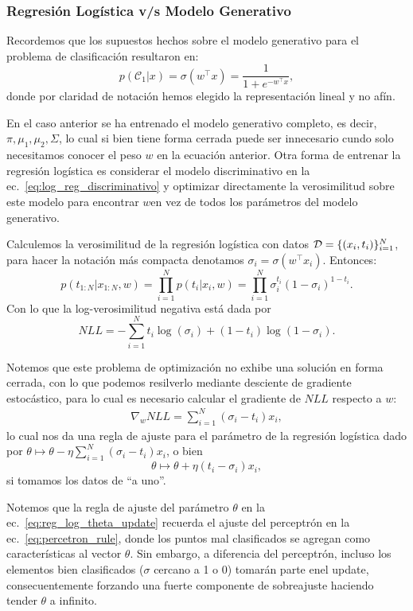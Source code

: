 \subsubsection{Regresión Logística v/s Modelo Generativo}

Recordemos que los supuestos hechos sobre el modelo generativo para el problema de clasificación resultaron en:
\begin{equation}
p(\mathcal{C}_1|x) = \sigma(w^\top x) = \frac{1}{1+e^{-w^\top x}} \label{eq:log_reg_discriminativo},
\end{equation}
donde por claridad de notación hemos elegido la representación lineal y no afín. 

En el caso anterior se ha entrenado el modelo generativo completo, es decir, $\pi, \mu_1,\mu_2, \Sigma$, lo cual si  bien tiene forma cerrada puede ser innecesario cundo solo necesitamos conocer el peso $w$ en la ecuación anterior. Otra forma de entrenar la  regresión logística es considerar el modelo discriminativo en la  ec.~\eqref{eq:log_reg_discriminativo} y optimizar  directamente la verosimilitud sobre  este modelo para encontrar $w$en vez de todos los parámetros  del modelo generativo.

Calculemos la verosimilitud de la regresión logística con datos ${\mathcal D}=\{(x_i,t_i)\}_{i=1}^N$, para hacer la notación más compacta denotamos $\sigma_i = \sigma(w^\top x_i)$. Entonces:
\begin{equation}
p(t_{1:N}|x_{1:N},w) = \prod_{i=1}^{N}p(t_i|x_i,w) =  \prod_{i=1}^{N}\sigma_i^{t_i}(1-\sigma_i)^{1-t_i}.
\end{equation}
Con lo que la log-verosimilitud negativa está dada por
\begin{equation}
	NLL = -\sum_{i=1}^N t_i\log(\sigma_i) + (1-t_i)\log(1-\sigma_i).
\end{equation}

Notemos que este  problema de optimización no exhibe una solución en forma cerrada, con lo que podemos resilverlo mediante desciente de gradiente estocástico, para lo cual es necesario calcular el gradiente de $NLL$ respecto a $w$:
\begin{align}
\nabla_w NLL = \sum_{i=1}^N (\sigma_i-t_i)x_i,
\end{align}
lo cual nos da una regla de  ajuste para el parámetro de la regresión logística dado por $\theta \mapsto \theta - \eta \sum_{i=1}^N (\sigma_i-t_i)x_i$, o bien 
\begin{equation}
	\theta \mapsto \theta + \eta(t_i-\sigma_i)x_i, \label{eq:reg_log_theta_update}
\end{equation}
si tomamos los  datos de ``a uno''.
\begin{remark}\label{rem:log_reg_shocks}
Notemos que la regla de ajuste del parámetro $\theta$ en la ec.~\eqref{eq:reg_log_theta_update} recuerda el ajuste del perceptrón en la ec.~\eqref{eq:percetron_rule}, donde los puntos mal clasificados se agregan como características al vector $\theta$. Sin  embargo, a diferencia del  perceptrón, incluso los elementos bien clasificados ($\sigma$  cercano a  1 o 0) tomarán parte enel update, consecuentemente forzando una  fuerte componente de sobreajuste  haciendo tender $\theta$ a infinito. 
\end{remark}
